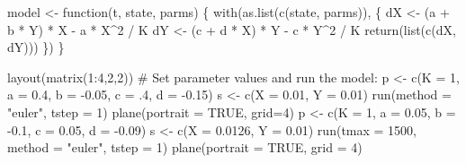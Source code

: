 \documentclass[
  a4paper,
  DIV=11,
  numbers=noendperiod,
  oneside]{scrreprt}
\newenvironment{Shaded}{}{}
\newcommand{\AttributeTok}[1]{\textcolor[rgb]{0.84,0.23,0.29}{#1}}
\newcommand{\CommentTok}[1]{\textcolor[rgb]{0.42,0.45,0.49}{#1}}
\newcommand{\ConstantTok}[1]{\textcolor[rgb]{0.00,0.36,0.77}{#1}}
\newcommand{\ControlFlowTok}[1]{\textcolor[rgb]{0.84,0.23,0.29}{#1}}
\newcommand{\DecValTok}[1]{\textcolor[rgb]{0.00,0.36,0.77}{#1}}
\newcommand{\FloatTok}[1]{\textcolor[rgb]{0.00,0.36,0.77}{#1}}
\newcommand{\FunctionTok}[1]{\textcolor[rgb]{0.44,0.26,0.76}{#1}}
\newcommand{\NormalTok}[1]{\textcolor[rgb]{0.14,0.16,0.18}{#1}}
\newcommand{\OtherTok}[1]{\textcolor[rgb]{0.44,0.26,0.76}{#1}}
\newcommand{\SpecialCharTok}[1]{\textcolor[rgb]{0.00,0.36,0.77}{#1}}
\newcommand{\StringTok}[1]{\textcolor[rgb]{0.01,0.18,0.38}{#1}}
\begin{document}
\begin{Shaded}
\begin{Highlighting}[]
\NormalTok{model }\OtherTok{\textless{}{-}} \ControlFlowTok{function}\NormalTok{(t, state, parms) \{}
  \FunctionTok{with}\NormalTok{(}\FunctionTok{as.list}\NormalTok{(}\FunctionTok{c}\NormalTok{(state, parms)), \{}
\NormalTok{    dX }\OtherTok{\textless{}{-}}\NormalTok{ (a }\SpecialCharTok{+}\NormalTok{ b }\SpecialCharTok{*}\NormalTok{ Y) }\SpecialCharTok{*}\NormalTok{ X }\SpecialCharTok{{-}}\NormalTok{ a }\SpecialCharTok{*}\NormalTok{ X}\SpecialCharTok{\^{}}\DecValTok{2} \SpecialCharTok{/}\NormalTok{ K}
\NormalTok{    dY }\OtherTok{\textless{}{-}}\NormalTok{ (c }\SpecialCharTok{+}\NormalTok{ d }\SpecialCharTok{*}\NormalTok{ X) }\SpecialCharTok{*}\NormalTok{ Y }\SpecialCharTok{{-}}\NormalTok{ c }\SpecialCharTok{*}\NormalTok{ Y}\SpecialCharTok{\^{}}\DecValTok{2} \SpecialCharTok{/}\NormalTok{ K}
    \FunctionTok{return}\NormalTok{(}\FunctionTok{list}\NormalTok{(}\FunctionTok{c}\NormalTok{(dX, dY)))}
\NormalTok{  \}) \}}

\FunctionTok{layout}\NormalTok{(}\FunctionTok{matrix}\NormalTok{(}\DecValTok{1}\SpecialCharTok{:}\DecValTok{4}\NormalTok{,}\DecValTok{2}\NormalTok{,}\DecValTok{2}\NormalTok{))}
\CommentTok{\# Set parameter values and run the model:}
\NormalTok{p }\OtherTok{\textless{}{-}} \FunctionTok{c}\NormalTok{(}\AttributeTok{K =} \DecValTok{1}\NormalTok{, }\AttributeTok{a =} \FloatTok{0.4}\NormalTok{, }\AttributeTok{b =} \SpecialCharTok{{-}}\FloatTok{0.05}\NormalTok{, }\AttributeTok{c =}\NormalTok{ .}\DecValTok{4}\NormalTok{, }\AttributeTok{d =} \SpecialCharTok{{-}}\FloatTok{0.15}\NormalTok{)}
\NormalTok{s }\OtherTok{\textless{}{-}} \FunctionTok{c}\NormalTok{(}\AttributeTok{X =} \FloatTok{0.01}\NormalTok{, }\AttributeTok{Y =} \FloatTok{0.01}\NormalTok{)}
\FunctionTok{run}\NormalTok{(}\AttributeTok{method =} \StringTok{"euler"}\NormalTok{, }\AttributeTok{tstep =} \DecValTok{1}\NormalTok{)}
\FunctionTok{plane}\NormalTok{(}\AttributeTok{portrait =} \ConstantTok{TRUE}\NormalTok{, }\AttributeTok{grid=}\DecValTok{4}\NormalTok{)}
\NormalTok{p }\OtherTok{\textless{}{-}} \FunctionTok{c}\NormalTok{(}\AttributeTok{K =} \DecValTok{1}\NormalTok{, }\AttributeTok{a =} \FloatTok{0.05}\NormalTok{, }\AttributeTok{b =} \SpecialCharTok{{-}}\FloatTok{0.1}\NormalTok{,  }\AttributeTok{c =} \FloatTok{0.05}\NormalTok{, }\AttributeTok{d =} \SpecialCharTok{{-}}\FloatTok{0.09}\NormalTok{)}
\NormalTok{s }\OtherTok{\textless{}{-}} \FunctionTok{c}\NormalTok{(}\AttributeTok{X =} \FloatTok{0.0126}\NormalTok{, }\AttributeTok{Y =} \FloatTok{0.01}\NormalTok{)}
\FunctionTok{run}\NormalTok{(}\AttributeTok{tmax =} \DecValTok{1500}\NormalTok{, }\AttributeTok{method =} \StringTok{"euler"}\NormalTok{, }\AttributeTok{tstep =} \DecValTok{1}\NormalTok{)}
\FunctionTok{plane}\NormalTok{(}\AttributeTok{portrait =} \ConstantTok{TRUE}\NormalTok{, }\AttributeTok{grid =} \DecValTok{4}\NormalTok{)}
\end{Highlighting}
\end{Shaded}
\end{document}
